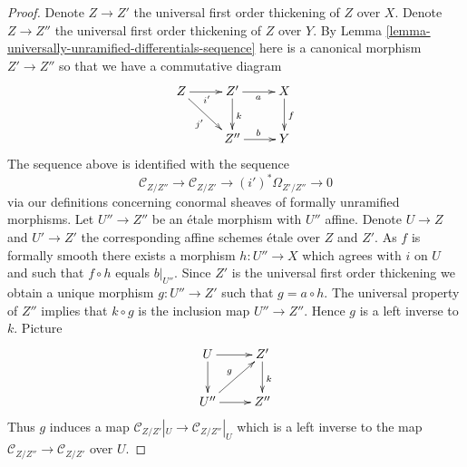 \documentclass[10pt,a4paper]{amsart}
\theoremstyle{plain}
\theoremstyle{definition}
\theoremstyle{remark}
\numberwithin{equation}{subsection}
\begin{document}
\begin{proof}
Denote $Z \to Z'$ the universal first order thickening of $Z$ over $X$.
Denote $Z \to Z''$ the universal first order thickening of $Z$ over $Y$.
By
Lemma \ref{lemma-universally-unramified-differentials-sequence}
here is a canonical morphism $Z' \to Z''$ so that we have a commutative
diagram
$$
\xymatrix{
Z \ar[r]_{i'} \ar[rd]_{j'} & Z' \ar[r]_a \ar[d]^k & X \ar[d]^f \\
& Z'' \ar[r]^b & Y
}
$$
The sequence above is identified with the sequence
$$
\mathcal{C}_{Z/Z''} \to
\mathcal{C}_{Z/Z'} \to
(i')^*\Omega_{Z'/Z''} \to 0
$$
via our definitions concerning conormal sheaves of formally unramified
morphisms. Let $U'' \to Z''$ be an \'etale morphism with $U''$ affine.
Denote $U \to Z$ and $U' \to Z'$ the corresponding affine
schemes \'etale over $Z$ and $Z'$.
As $f$ is formally smooth there exists a morphism $h : U'' \to X$
which agrees with $i$ on $U$ and such that $f \circ h$ equals $b|_{U''}$.
Since $Z'$ is the universal first order thickening we obtain a unique
morphism $g : U'' \to Z'$ such that $g = a \circ h$. The universal
property of $Z''$ implies that $k \circ g$ is the inclusion map
$U'' \to Z''$. Hence $g$ is a left inverse to $k$. Picture
$$
\xymatrix{
U \ar[d] \ar[r] & Z' \ar[d]^k \\
U'' \ar[r] \ar[ru]^g & Z''
}
$$
Thus $g$ induces a map $\mathcal{C}_{Z/Z'}|_U \to \mathcal{C}_{Z/Z''}|_U$
which is a left inverse to the map
$\mathcal{C}_{Z/Z''} \to \mathcal{C}_{Z/Z'}$ over $U$.
\end{proof}
\end{document}
